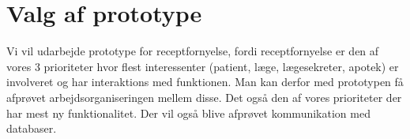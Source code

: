 \section{Valg af prototype}
Vi vil udarbejde prototype for receptfornyelse, fordi receptfornyelse er den af vores 3 prioriteter hvor flest interessenter (patient, læge, lægesekreter, apotek)  er involveret og har interaktions med funktionen. Man kan derfor med prototypen få afprøvet arbejdsorganiseringen mellem disse. Det også den af vores prioriteter der har mest ny funktionalitet. Der vil også blive afprøvet kommunikation med databaser.